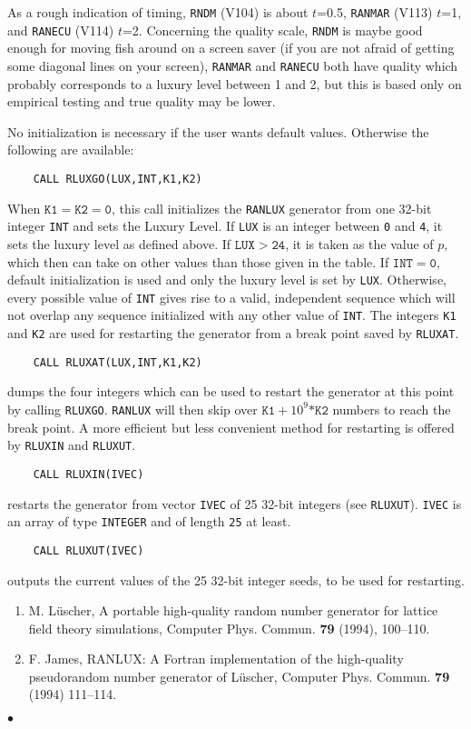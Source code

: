 As a rough indication of timing, {\tt RNDM} (V104) is about $t$=0.5,
{\tt RANMAR} (V113) $t$=1, and {\tt RANECU} (V114) $t$=2.
Concerning the quality scale, {\tt RNDM} is maybe good enough
for moving fish around on a screen saver (if you are not afraid of
getting some diagonal lines on your screen),
{\tt RANMAR} and {\tt RANECU} both have
quality which probably corresponds to a luxury level between 1 and 2, but
this is based only on empirical testing and true quality may be lower.
\par
No initialization is necessary if the user wants default values.
Otherwise the following are available:
\begin{verbatim}
    CALL RLUXGO(LUX,INT,K1,K2)
\end{verbatim}
When $\mathtt{K1=K2=0}$, this call initializes
the {\tt RANLUX} generator from one 32-bit integer {\tt INT} and sets
the Luxury Level. If {\tt LUX} is an integer between {\tt 0} and
{\tt 4}, it sets the luxury level as defined above.
If $\mathtt{LUX > 24}$, it is taken as the value of $p$,
which then can take on other values than those given in the table.
If $\mathtt{INT=0}$, default initialization is used and only the
luxury level is set by {\tt LUX}.  Otherwise, every possible
value of {\tt INT} gives rise to a valid, independent sequence
which will not overlap any sequence initialized with any
other value of {\tt INT}.  The integers {\tt K1} and {\tt K2} are used
for restarting the generator from a break point saved by {\tt RLUXAT}.
\begin{verbatim}
    CALL RLUXAT(LUX,INT,K1,K2)
\end{verbatim}
dumps the four integers which can be used
to restart the generator at this point by calling {\tt RLUXGO}.
{\tt RANLUX} will then skip over $\mathtt{K1}+10^9\mathtt{*K2}$ numbers
to reach the break point. A more efficient but less convenient
method for restarting is offered by {\tt RLUXIN} and {\tt RLUXUT}.
\begin{verbatim}
    CALL RLUXIN(IVEC)
\end{verbatim}
restarts the generator from vector {\tt IVEC} of
25 32-bit integers (see {\tt RLUXUT}).
{\tt IVEC} is an array of type {\tt INTEGER} and
of length {\tt 25} at least.
\begin{verbatim}
    CALL RLUXUT(IVEC)
\end{verbatim}
outputs the current values of the 25 32-bit
integer seeds, to be used for restarting.
\Refer
\begin{enumerate}
\item
M. L\"uscher, A portable high-quality random number generator for
lattice field theory simulations,
Computer Phys. Commun. {\bf 79} (1994), 100--110.
\item F. James, RANLUX: A Fortran implementation of the high-quality
pseudorandom number generator of L\"uscher,
Computer Phys. Commun. {\bf 79} (1994) 111--114.
\end{enumerate}
$\bullet$
 
 
